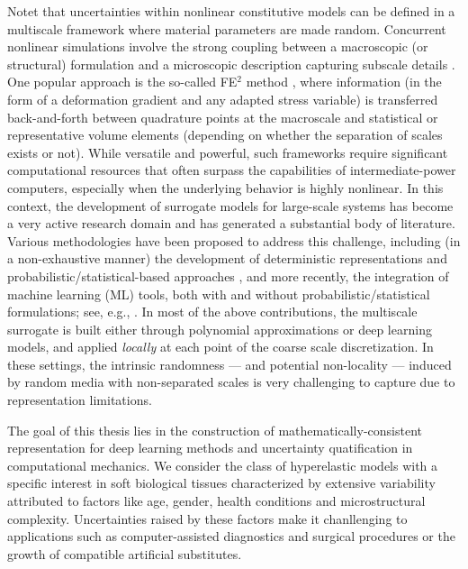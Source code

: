 Notet that uncertainties within nonlinear constitutive models can be defined in a multiscale framework where material parameters are made random. Concurrent nonlinear simulations involve the strong coupling between a macroscopic (or structural) formulation and a microscopic description capturing subscale details \cite{ghosh1996two,smit1998prediction,feyel1999multiscale,feyel2000fe2,terada2001class,kouznetsova2002multi,geers2016multiscale,raju2021review}. One popular approach is the so-called FE$^2$ method \cite{feyel1999multiscale,feyel2000fe2}, where information (in the form of a deformation gradient and any adapted stress variable) is transferred back-and-forth between quadrature points at the macroscale and statistical or representative volume elements (depending on whether the separation of scales exists or not). While versatile and powerful, such frameworks require significant computational resources that often surpass the capabilities of intermediate-power computers, especially when the underlying behavior is highly nonlinear. In this context, the development of surrogate models for large-scale systems has become a very active research domain and has generated a substantial body of literature. Various methodologies have been proposed to address this challenge, including (in a non-exhaustive manner) the development of deterministic representations \cite{yvonnet2007reduced,monteiro2008computational,yvonnet2009numerically, temizer2007adaptive,temizer2007numerical,fritzen2013reduced,bhattacharjee2016nonlinear, yvonnet2013computational,fritzen2018two,liu2016self,han2020efficient,feng2021concurrent} and probabilistic/statistical-based approaches \cite{efendiev2004multiscale,efendiev2009multiscale,weinan2003heterognous,weinan2007heterogeneous,abdulle2013adaptive,abdulle2012heterogeneous}, and more recently, the integration of machine learning (ML) tools, both with and without probabilistic/statistical formulations; see, e.g., \cite{le2015computational,rao2020three,lu2019data,leung2022nh,nguyen2019surrogate,minh2020surrogate,feng2022finite,han2023neural,wessels2022computational,black2023deep}. In most of the above contributions, the multiscale surrogate is built either through polynomial approximations or deep learning models, and applied \textit{locally} at each point of the coarse scale discretization. In these settings, the intrinsic randomness --- and potential non-locality --- induced by random media with non-separated scales is very challenging to capture due to representation limitations.

The goal of this thesis lies in the construction of mathematically-consistent representation for deep learning methods and uncertainty quatification in computational mechanics. We consider the class of hyperelastic models with a specific interest in soft biological tissues characterized by extensive variability attributed to factors like age, gender, health conditions and microstructural complexity. Uncertainties raised by these factors make it chanllenging to applications such as computer-assisted diagnostics and surgical procedures or the growth of compatible artificial substitutes.

